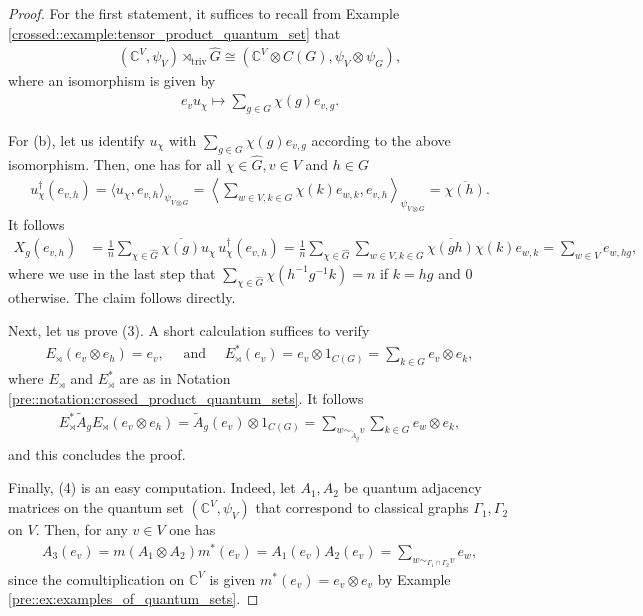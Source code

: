 \documentclass{amsart}
\newcommand{\C}{\mathbb{C}}
\theoremstyle{definition}
\theoremstyle{definition}
\begin{document}
\begin{proof}
    For the first statement, it suffices to recall from Example \ref{crossed::example:tensor_product_quantum_set} that
    \begin{align*}
        (\C^V, \psi_V) \rtimes_{\mathrm{triv}} \hat{G} \cong (\C^V \otimes C(G), \psi_V \otimes \psi_G),
    \end{align*}
    where an isomorphism is given by
    \begin{align*}
        e_v u_\chi \mapsto \sum_{g \in G} \chi(g) e_{v,g}.
    \end{align*}

    For (b), let us identify $u_\chi$ with $\sum_{g \in G} \chi(g) e_{v,g}$ according to the above isomorphism. Then, one has for all $\chi \in \hat{G}, v \in V$ and $h \in G$
    \begin{align*}
        u_\chi^\dagger(e_{v,h})
            = \langle u_\chi, e_{v,h} \rangle_{\psi_{V \otimes G}}
            = \left\langle \sum_{w \in V, k \in G} \chi(k) e_{w,k}, e_{v,h} \right\rangle_{\psi_{V \otimes G}}
            = \overline{\chi(h)}.
    \end{align*}
    It follows
    \begin{align*}
        X_g(e_{v, h}) &= \frac{1}{n} \sum_{\chi \in \hat{G}} \overline{\chi(g)} u_\chi \, u_\chi^\dagger(e_{v, h})
            = \frac{1}{n} \sum_{\chi \in \hat{G}} \sum_{w \in V, k \in G} \overline{\chi(g h)} \chi(k) e_{w, k}
            = \sum_{w \in V} e_{w, h g},
    \end{align*}
    where we use in the last step that $\sum_{\chi \in \hat{G}} \chi(h^{-1} g^{-1} k) = n$ if $k = h g$ and $0$ otherwise. The claim follows directly.

    Next, let us prove (3). A short calculation suffices to verify
    \begin{align*}
        E_\rtimes(e_v \otimes e_h) = e_v,
        \quad \text{ and } \quad
        E_\rtimes^\ast(e_v) = e_v \otimes 1_{C(G)} = \sum_{k \in G} e_v \otimes e_k,
    \end{align*}
    where $E_\rtimes$ and $E_\rtimes^\ast$ are as in Notation \ref{pre::notation:crossed_product_quantum_sets}.
    It follows
    \begin{align*}
        E_\rtimes^\ast \tilde{A}_g E_\rtimes(e_v \otimes e_h) 
            = \tilde{A}_g(e_v) \otimes 1_{C(G)}
            = \sum_{w \sim_{\tilde{A}_g} v} \sum_{k \in G} e_w \otimes e_k,
    \end{align*}
    and this concludes the proof.

    Finally, (4) is an easy computation. Indeed, let $A_1, A_2$ be quantum adjacency matrices on the quantum set $(\C^{V}, \psi_{V})$ that correspond to classical graphs $\Gamma_1, \Gamma_2$ on $V$. Then, for any $v \in V$ one has
    \begin{align*}
        A_3(e_{v}) = m(A_1 \otimes A_2) m^\ast (e_{v})
            = A_1(e_v) A_2(e_v)
            = \sum_{w \sim_{\Gamma_1 \cap \Gamma_2} v} e_w,
    \end{align*}
    since the comultiplication on $\C^V$ is given $m^\ast(e_v) = e_v \otimes e_v$ by Example \ref{pre::ex:examples_of_quantum_sets}.
\end{proof}
\end{document}
